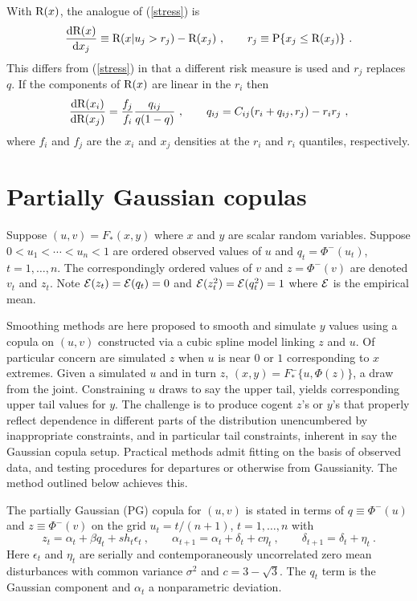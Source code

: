 \documentclass[authoryear]{elsarticle}
\newcommand{\p}{\mathrm{P}}
\newcommand{\eps}{\epsilon}
\newcommand{\Ex}{{\cal E}}
\newcommand{\de}{\mathrm{d}}
\newcommand{\eref}[1]{(\ref{#1})}
\newcommand{\cq}{\ , \qquad}
\newcommand{\be}[1]{\begin{equation}\label{#1}}
\newcommand{\ee}{\end{equation}}
\begin{document}
With $\mathrm{R}(x)$, the analogue of \eref{stress} is 
\be{stress2}
\frac{\de\r(x)}{\de x_j} \equiv \r(x|u_j>r_j) - \r(x_j)\cq r_j\equiv\p\{x_j\le\r(x_j)\} \ .
\ee
This differs from \eref{stress}  in that a different risk measure is used and  $r_j$ replaces $q$.   If  the components of $\mathrm{R}(x)$ are linear in the $r_i$ then
\be{implicit2}
\frac{\de\r(x_i)}{\de\r(x_j)} =  
\frac{f_j}{f_i} 
 \frac{q_{ij}}{q(1-q)}\cq q_{ij}=C_{ij}(r_i+q_{ij},r_j) - r_ir_j\ ,
\ee
where $f_i$ and $f_j$ are the $x_i$ and $x_j$ densities at the $r_i$ and $r_i$ quantiles, respectively. 

\section{Partially Gaussian copulas}

Suppose $(u,v)=F_*(x,y)$  where $x$ and $y$ are scalar random variables.    Suppose $0<u_1<\cdots<u_n<1$  are   ordered observed values of $u$ and $q_t=\Phi^-(u_t)$, $t=1,\ldots,n$.  The correspondingly ordered values of $v$ and $z=\Phi^-(v)$ are denoted $v_t$ and $z_t$.  Note $\Ex(z_t)=\Ex(q_t)=0$ and $\Ex(z^2_t)=\Ex(q^2_t)=1$ where $\Ex$  is the empirical mean. 

Smoothing methods are here proposed to smooth and simulate $y$ values  using a copula on $(u,v)$ constructed via    a cubic spline model linking $z$ and $u$.   Of particular concern are simulated $z$ when $u$ is  near $0$ or $1$ corresponding to  $x$ extremes.    Given a simulated $u$ and in turn $z$, $(x,y)=F^-_*\{u,\Phi(z)\}$, a draw from the joint.  Constraining $u$ draws to say the upper tail, yields corresponding upper tail values for $y$.   The challenge is to produce cogent $z$'s or $y$'s that properly reflect dependence in different parts of the distribution unencumbered by inappropriate constraints, and in particular tail constraints, inherent in say the Gaussian copula setup.    Practical methods admit fitting on the basis of observed data, and testing procedures for  departures or otherwise from Gaussianity.   The method outlined below achieves this.

The partially Gaussian  (PG) copula for $(u,v)$ is stated in terms of  $q\equiv\Phi^-(u)$ and $z\equiv\Phi^-(v)$ on the grid   $u_t=t/(n+1)$, $t=1,\ldots,n$ with 
\be{cusp}
z_t = \alpha_t+\beta q_t+ sh_t\eps_t\cq \alpha_{t+1}=\alpha_t +\delta_t+c\eta_t\cq \delta_{t+1}=\delta_t+\eta_t\ .
\ee
Here $\eps_t$ and $\eta_t$ are serially and contemporaneously uncorrelated zero mean disturbances with common variance $\sigma^2$ and $c=3-\sqrt 3$. The  $q_t$ term is the   Gaussian component and  $\alpha_t$ a nonparametric deviation.   
\end{document}
